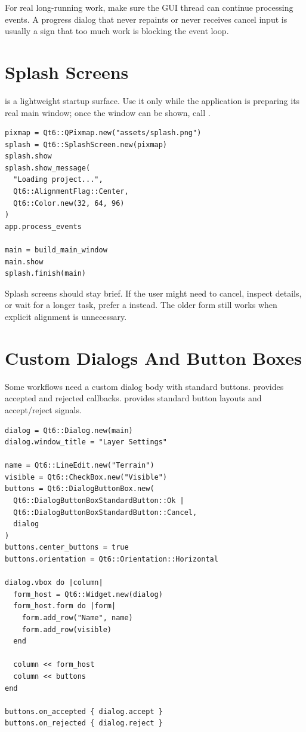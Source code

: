 For real long-running work, make sure the GUI thread can continue processing events. A progress dialog that never repaints or never receives cancel input is usually a sign that too much work is blocking the event loop.

\section{Splash Screens}

 is a lightweight startup surface. Use it only while the application is preparing its real main window; once the window can be shown, call .

\begin{lstlisting}[style=crystal]
pixmap = Qt6::QPixmap.new("assets/splash.png")
splash = Qt6::SplashScreen.new(pixmap)
splash.show
splash.show_message(
  "Loading project...",
  Qt6::AlignmentFlag::Center,
  Qt6::Color.new(32, 64, 96)
)
app.process_events

main = build_main_window
main.show
splash.finish(main)
\end{lstlisting}

Splash screens should stay brief. If the user might need to cancel, inspect details, or wait for a longer task, prefer a  instead. The older  form still works when explicit alignment is unnecessary.

\section{Custom Dialogs And Button Boxes}

Some workflows need a custom dialog body with standard buttons.  provides accepted and rejected callbacks.  provides standard button layouts and accept/reject signals.


\begin{lstlisting}[style=crystal]
dialog = Qt6::Dialog.new(main)
dialog.window_title = "Layer Settings"

name = Qt6::LineEdit.new("Terrain")
visible = Qt6::CheckBox.new("Visible")
buttons = Qt6::DialogButtonBox.new(
  Qt6::DialogButtonBoxStandardButton::Ok |
  Qt6::DialogButtonBoxStandardButton::Cancel,
  dialog
)
buttons.center_buttons = true
buttons.orientation = Qt6::Orientation::Horizontal

dialog.vbox do |column|
  form_host = Qt6::Widget.new(dialog)
  form_host.form do |form|
    form.add_row("Name", name)
    form.add_row(visible)
  end

  column << form_host
  column << buttons
end

buttons.on_accepted { dialog.accept }
buttons.on_rejected { dialog.reject }
\end{lstlisting}

